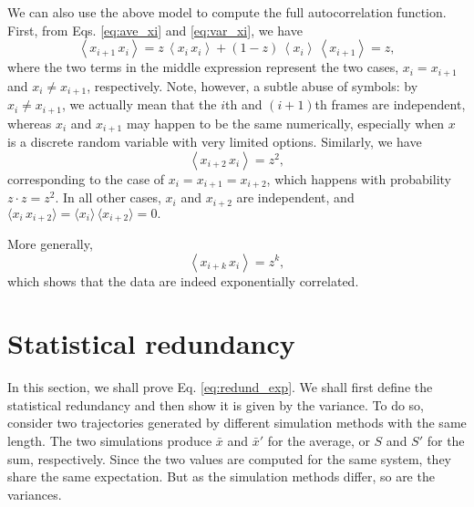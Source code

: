 \documentclass[12pt]{article}
\begin{document}
We can also use the above model to compute the full autocorrelation function.
%
First, from Eqs. \eqref{eq:ave_xi} and \eqref{eq:var_xi}, we have
$$
\left\langle x_{i + 1} \, x_i \right\rangle
=
z \, \left\langle x_i \, x_i \right\rangle
+
(1 - z) \, \left\langle x_i \right\rangle
        \, \left\langle x_{i + 1} \right\rangle
= z,
$$
where the two terms in the middle expression represent
the two cases, $x_i = x_{i + 1}$ and $x_i \ne x_{i + 1}$,
respectively.
%
Note, however, a subtle abuse of symbols:
by $x_i \ne x_{i + 1}$, we actually mean that
the $i$th and $(i + 1)$th frames are independent,
whereas $x_i$ and $x_{i+1}$ may happen to be the same numerically,
especially when $x$ is a discrete random variable
with very limited options.
%
Similarly, we have
$$
\left\langle x_{i + 2} \, x_i \right\rangle
= z^2,
$$
corresponding to the case of $x_i = x_{i + 1} = x_{i + 2}$,
which happens with probability $z \cdot z = z^2$.
%
In all other cases,
$x_i$ and $x_{i + 2}$ are independent, and
$
\langle x_i \, x_{i + 2} \rangle
=
\langle x_i \rangle \, \langle x_{i + 2} \rangle
= 0.
$

More generally,
%
\begin{equation}
  \left\langle x_{i + k} \, x_i \right\rangle = z^k,
  \label{eq:xxk_exp}
\end{equation}
%
which shows that the data are indeed exponentially correlated.



\section{\label{sec:redund}
Statistical redundancy}


In this section,
we shall prove Eq. \eqref{eq:redund_exp}.
%
We shall first define the statistical redundancy
and then show it is given by the variance.
%
To do so, consider two trajectories generated by
different simulation methods with the same length.
%
The two simulations produce
$\bar x$ and $\bar x'$ for the average,
or
$S$ and $S'$ for the sum, respectively.
%
Since the two values are computed for the same system,
they share the same expectation.
%
But as the simulation methods differ, so are the variances.
\end{document}
